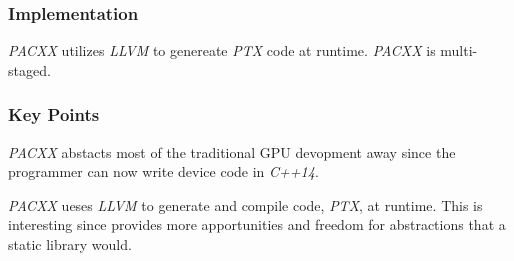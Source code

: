 \subsubsection{Implementation}
\textit{PACXX} utilizes \textit{LLVM} to genereate \textit{PTX} code at runtime. \textit{PACXX} is multi-staged.

\subsubsection{Key Points}
\textit{PACXX} abstacts most of the traditional GPU devopment away since the programmer can now write device code in \textit{C++14}.

\textit{PACXX} ueses \textit{LLVM} to generate and compile code, \textit{PTX}, at runtime. This is interesting since provides more apportunities and freedom for abstractions that a static library would.